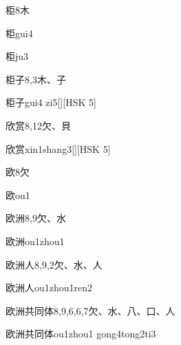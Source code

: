 \begin{entry}{柜}{8}{⽊}
  \begin{phonetics}{柜}{gui4}
  \end{phonetics}
  \begin{phonetics}{柜}{ju3}
  \end{phonetics}
\end{entry}

\begin{entry}{柜子}{8,3}{⽊、⼦}
  \begin{phonetics}{柜子}{gui4 zi5}[][HSK 5]
  \end{phonetics}
\end{entry}

\begin{entry}{欣赏}{8,12}{⽋、⾙}
  \begin{phonetics}{欣赏}{xin1shang3}[][HSK 5]
  \end{phonetics}
\end{entry}

\begin{entry}{欧}{8}{⽋}
  \begin{phonetics}{欧}{ou1}
  \end{phonetics}
\end{entry}

\begin{entry}{欧洲}{8,9}{⽋、⽔}
  \begin{phonetics}{欧洲}{ou1zhou1}
  \end{phonetics}
\end{entry}

\begin{entry}{欧洲人}{8,9,2}{⽋、⽔、⼈}
  \begin{phonetics}{欧洲人}{ou1zhou1ren2}
  \end{phonetics}
\end{entry}

\begin{entry}{欧洲共同体}{8,9,6,6,7}{⽋、⽔、⼋、⼝、⼈}
  \begin{phonetics}{欧洲共同体}{ou1zhou1 gong4tong2ti3}
  \end{phonetics}
\end{entry}

